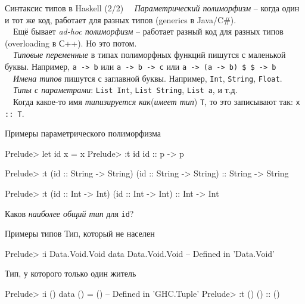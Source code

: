 \documentclass{beamer}
\newcommand{\inline}[1]{\lstinline{haskell}{#1}}
\def\hsinline{\lstinline[style={hsstyle1}]}
\def\inline{\hsinline}
\def\faQuestion{{\FA\symbol{"F128}}}
\begin{document}
\begin{frame}{Синтаксис типов в Haskell (2/2)}
~\ \emph{Параметрический полиморфизм} -- когда один и тот же код, работает для разных типов
(generics в Java/C\#).
\\
~\ Ещё бывает \emph{ad-hoc полиморфизм} -- работает разный код для разных типов (overloading в С++). Но это потом.
\\
~\ \emph{Типовые переменные} в типах полиморфных функций пишутся с маленькой буквы. Например, \inline{a -> b} или \inline{a -> b -> c} или 
\inline=a -> (a -> b) $ $ -> b=
\vspace{0.5cm} 
\\ \pause
~\ \emph{Имена типов} пишутся с заглавной буквы. Например,  \inline=Int=, \inline=String=, \inline=Float=.
\vspace{0.5cm} 
\\ \pause
~\ \emph{Типы с параметрами}: \inline=List Int=, \inline=List String=, \inline=List a=, и т.д. 
\vspace{0.5cm} 
\\ \pause
~\ Когда какое-то имя \emph{типизируется как}(\emph{имеет тип}) \inline=T=, то это записывают так: \inline=x :: T=.
\end{frame}

\begin{frame}[fragile]{Примеры параметрического полиморфизма}
\begin{hslisting}
Prelude> let id x = x
Prelude> :t id
id :: p -> p
\end{hslisting}
\pause
\begin{hslisting}
Prelude> :t (id :: String -> String)
(id :: String -> String) :: String -> String
\end{hslisting}
\pause
\begin{hslisting}
Prelude> :t (id :: Int -> Int)
(id :: Int -> Int) :: Int -> Int
\end{hslisting}
{\Large \faQuestion} Каков \textit{наиболее общий тип} для \inline=id=?
\end{frame}

\begin{frame}[fragile]{Примеры типов}
Тип, который не населен
\begin{hslisting}
Prelude> :i Data.Void.Void
data Data.Void.Void        -- Defined in 'Data.Void'
\end{hslisting}

Тип, у которого только один житель
\begin{hslisting}
Prelude> :i ()
data () = ()               -- Defined in 'GHC.Tuple'
Prelude> :t ()
() :: ()
\end{hslisting}
\end{frame}
\end{document}
